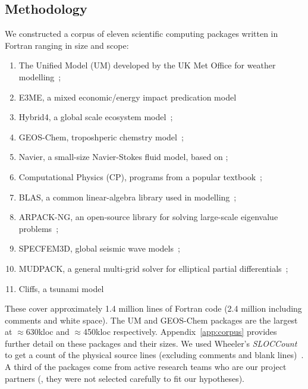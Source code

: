 \subsection{Methodology}
%
\noindent
We constructed a corpus of eleven scientific computing packages
written in Fortran ranging in size and scope:
%
\begin{enumerate}[leftmargin=1.76em]
\item The Unified Model (UM) developed by the UK Met Office
for weather modelling~\cite{um};
\item E3ME, a mixed economic/energy impact predication
  model~\cite{RePEc:aen:journl:2006se-a12}

\item Hybrid4, a global scale ecosystem model~\cite{GBC:GBC635};

\item GEOS-Chem, troposhperic chemstry model~\cite{geos-chem};

\item Navier, a small-size Navier-Stokes fluid model, based
  on \cite{griebel1997numerical};

\item Computational Physics (CP), programs from a popular
 textbook~\cite{giordano1997computational};

\item BLAS, a common linear-algebra
  library used in modelling~\cite{blas};

\item ARPACK-NG, an open-source library for solving large-scale
eigenvalue problems~\cite{arpackng};

\item SPECFEM3D, global seismic wave models~\cite{specfem3d};

\item MUDPACK, a general multi-grid solver for elliptical
partial differentials~\cite{MUD};

\item Cliffs, a tsunami model~\cite{tolkova2014land}
\end{enumerate}
%
These cover approximately 1.4 million lines of Fortran code
(2.4 million including comments and white space).  The UM and
GEOS-Chem packages are the largest at $\approx$630kloc and
$\approx$450kloc respectively.  Appendix~\ref{app:corpus} provides
further detail on these packages and their sizes.  We used Wheeler's
\emph{SLOCCount} to get a count of the physical source lines
(excluding comments and blank lines)~\cite{wheeler2001sloccount}.
A third of the packages come from active research teams who are our project
partners (\ie{}, they were not selected carefully to fit our
hypotheses).

